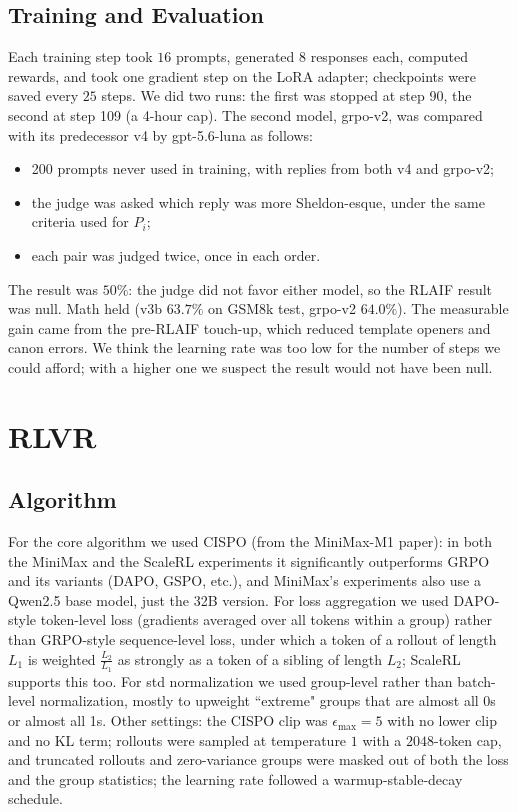 \documentclass[9pt]{extarticle}
\begin{document}
\subsection{Training and Evaluation}

Each training step took $16$ prompts, generated $8$ responses each, computed rewards, and took one gradient step on the LoRA adapter; checkpoints were saved every $25$ steps. We did two runs: the first was stopped at step 90, the second at step 109 (a 4-hour cap). The second model, grpo-v2, was compared with its predecessor v4 by gpt-5.6-luna as follows:
\begin{itemize}
    \item 200 prompts never used in training, with replies from both v4 and grpo-v2;
    \item the judge was asked which reply was more Sheldon-esque, under the same criteria used for $P_i$;
    \item each pair was judged twice, once in each order.
\end{itemize}

The result was $50\%$: the judge did not favor either model, so the RLAIF result was null. Math held (v3b $63.7\%$ on GSM8k test, grpo-v2 $64.0\%$). The measurable gain came from the pre-RLAIF touch-up, which reduced template openers and canon errors. We think the learning rate was too low for the number of steps we could afford; with a higher one we suspect the result would not have been null.

\section{RLVR}

\subsection{Algorithm}

For the core algorithm we used CISPO (from the MiniMax-M1 paper): in both the MiniMax and the ScaleRL experiments it significantly outperforms GRPO and its variants (DAPO, GSPO, etc.), and MiniMax's experiments also use a Qwen2.5 base model, just the 32B version. For loss aggregation we used DAPO-style token-level loss (gradients averaged over all tokens within a group) rather than GRPO-style sequence-level loss, under which a token of a rollout of length $L_1$ is weighted $\frac{L_2}{L_1}$ as strongly as a token of a sibling of length $L_2$; ScaleRL supports this too. For std normalization we used group-level rather than batch-level normalization, mostly to upweight ``extreme" groups that are almost all 0s or almost all 1s. Other settings: the CISPO clip was $\epsilon_{\max} = 5$ with no lower clip and no KL term; rollouts were sampled at temperature $1$ with a $2048$-token cap, and truncated rollouts and zero-variance groups were masked out of both the loss and the group statistics; the learning rate followed a warmup-stable-decay schedule.
\end{document}

